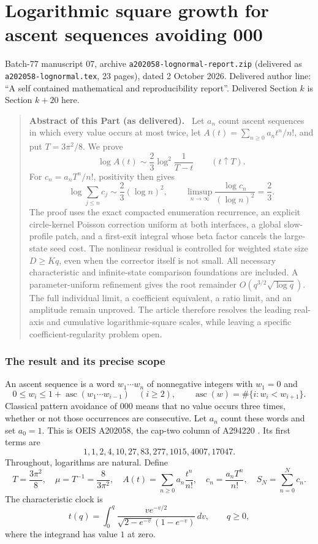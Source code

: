 \documentclass[11pt,letterpaper]{article}
\newcommand{\file}[1]{\nolinkurl{#1}}
\theoremstyle{remark}
\newcommand{\asc}{\operatorname{asc}}
\newcommand{\dd}{\,d}
\newenvironment{partabstract}{\begin{quote}\small\noindent\textbf{Abstract of this Part (as delivered).}\ }{\end{quote}}
\newcommand{\partsource}[1]{\par\noindent\begin{minipage}{\textwidth}\small #1\end{minipage}\par\medskip}
\begin{document}
\clearpage
\part{Logarithmic square growth for ascent sequences avoiding 000}\label{a58:part:ln}
\partsource{Batch-77 manuscript 07, archive \file{a202058-lognormal-report.zip} (delivered as \file{a202058-lognormal.tex}, 23 pages), dated 2 October 2026. Delivered author line: ``A self contained mathematical and reproducibility report''. Delivered Section $k$ is Section $k+20$ here.}
\begin{partabstract}
Let $a_n$ count ascent sequences in which every value occurs at most twice,
let $A(t)=\sum_{n\ge0}a_nt^n/n!$, and put $T=3\pi^2/8$.
We prove
\[
 \log A(t)\sim\frac23\log^2\frac1{T-t}\qquad(t\uparrow T).
\]
For $c_n=a_nT^n/n!$, positivity then gives
\[
 \log\sum_{j\le n}c_j\sim\frac23(\log n)^2,
 \qquad \limsup_{n\to\infty}\frac{\log c_n}{(\log n)^2}=\frac23.
\]
The proof uses the exact compacted enumeration recurrence, an explicit
circle-kernel Poisson correction uniform at both interfaces, a global
slow-profile patch, and a first-exit integral whose beta factor cancels the
large-state seed cost. The nonlinear residual is controlled for weighted
state size $D\ge Kq$, even when the corrector itself is not small.
All necessary characteristic and infinite-state comparison foundations
are included. A parameter-uniform refinement gives the root remainder
$O(q^{3/2}\sqrt{\log q})$. The full individual limit, a coefficient
equivalent, a ratio limit, and an amplitude remain unproved.
The article therefore resolves the leading real-axis and cumulative
logarithmic-square scales, while leaving a specific coefficient-regularity
problem open.
\end{partabstract}

\section{The result and its precise scope}
An ascent sequence is a word $w_1\cdots w_n$ of nonnegative integers with
$w_1=0$ and
\[
 0\le w_i\le1+\asc(w_1\cdots w_{i-1})\quad(i\ge2),\qquad
 \asc(w)=\#\{i:w_i<w_{i+1}\}.
\]
Classical pattern avoidance of $000$ means that no value occurs three
times, whether or not those occurrences are consecutive. Let $a_n$ count
these words and set $a_0=1$. This is OEIS A202058, the cap-two column of
A294220 \cite{OEIS,OEIStriangle}. Its first terms are
\[
 1,1,2,4,10,27,83,277,1015,4007,17047.
\]
Throughout, logarithms are natural. Define
\begin{equation}\label{a58:ln:eq:normalization}
 T=\frac{3\pi^2}{8},\quad \mu=T^{-1}=\frac8{3\pi^2},\quad
 A(t)=\sum_{n\ge0}a_n\frac{t^n}{n!},\quad
 c_n=\frac{a_nT^n}{n!},\quad S_N=\sum_{n=0}^N c_n.
\end{equation}
The characteristic clock is
\begin{equation}\label{a58:ln:eq:clock}
 t(q)=\int_0^q
 \frac{v e^{-v/2}}{\sqrt{2-e^{-v}}(1-e^{-v})}\dd v,
 \qquad q\ge0,
\end{equation}
where the integrand has value $1$ at zero.
\end{document}
